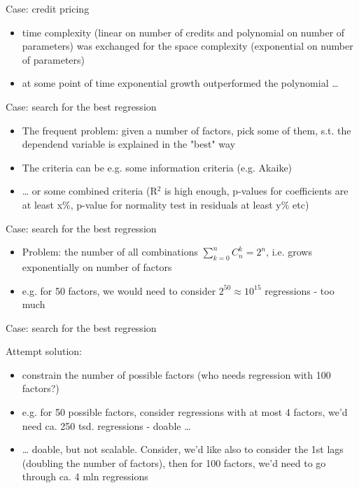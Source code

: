 \documentclass[presentation]{beamer}
\begin{document}
\begin{frame}[label=sec-3-10]{Case: credit pricing}
\begin{itemize}
\item time complexity (linear on number of credits and polynomial on number of parameters) was exchanged for the space complexity (exponential on number of parameters)
\item at some point of time exponential growth outperformed the polynomial \ldots{}
\end{itemize}
\end{frame}
\begin{frame}[label=sec-3-11]{Case: search for the best regression}
\begin{itemize}
\item The frequent problem: given a number of factors, pick some of them, s.t. the dependend variable is explained in the "best" way
\item The criteria can be e.g. some information criteria (e.g. Akaike)
\item \ldots{} or some combined criteria (R$^{\text{2}}$ is high enough, p-values for coefficients are at least x\%, p-value for normality test in residuals at least y\% etc)
\end{itemize}
\end{frame}
\begin{frame}[label=sec-3-12]{Case: search for the best regression}
\begin{itemize}
\item Problem: the number of all combinations $\sum_{k=0}^n C_n^k = 2^n$, i.e. grows exponentially on number of factors
\item e.g. for 50 factors, we would need to consider $2^{50} \approx 10^{15}$ regressions - too much
\end{itemize}
\end{frame}
\begin{frame}[label=sec-3-13]{Case: search for the best regression}
\begin{block}{Attempt solution:}
\begin{itemize}
\item constrain the number of possible factors (who needs regression with 100 factors?)
\item e.g. for 50 possible factors, consider regressions with at most 4 factors, we'd need ca. 250 tsd. regressions - doable \ldots{}
\item \ldots{} doable, but not scalable. Consider, we'd like also to consider the 1st lags (doubling the number of factors), then for 100 factors, we'd need to go through ca. 4 mln regressions
\end{itemize}
\end{block}
\end{frame}
\end{document}
